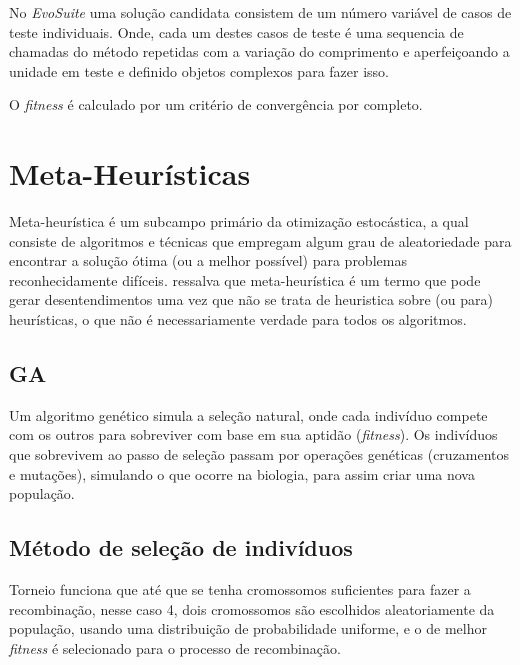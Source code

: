 \documentclass[12pt,a4paper]{article}
\begin{document}
No \textit{EvoSuite} uma solução candidata consistem de um número variável de casos de teste individuais. Onde, cada um destes casos de teste é uma sequencia de chamadas do método repetidas
com a variação do comprimento e aperfeiçoando a unidade em teste e definido objetos complexos para fazer isso.  

O \textit{fitness} é calculado por um critério de convergência por completo.  



\newpage

\section{Meta-Heurísticas}
Meta-heurística é um subcampo primário da otimização estocástica, a qual consiste de algoritmos e técnicas que empregam algum grau de aleatoriedade para encontrar a solução ótima (ou a melhor possível) para problemas reconhecidamente difíceis. \citeauthor{luke2009essentials} \cite{luke2009essentials} ressalva que meta-heurística é um termo que pode gerar desentendimentos uma vez que não se trata de heuristica sobre (ou para) heurísticas, o que não é necessariamente verdade para todos os algoritmos. 

\subsection{GA}
\label{sec:alg_genetic}

Um algoritmo genético simula a seleção natural, onde cada indivíduo compete com os outros para sobreviver com base em sua aptidão (\emph{fitness}). Os indivíduos que sobrevivem ao passo de
seleção passam por operações genéticas (cruzamentos e mutações), simulando o que ocorre na biologia, para assim criar uma nova população.

    \subsection{Método de seleção de indivíduos}

        Torneio funciona que até que se tenha cromossomos suficientes para fazer a recombinação, nesse caso 4, dois cromossomos são escolhidos aleatoriamente da população, usando uma distribuição de
        probabilidade uniforme, e o de melhor \textit{fitness} é selecionado para o processo de recombinação.
\end{document}
